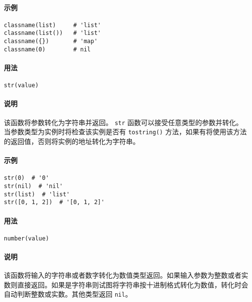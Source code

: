 \paragraph{示例}
\begin{lstlisting}[language=berry, numbers=none]
classname(list)     # 'list'
classname(list())   # 'list'
classname({})       # 'map'
classname(0)        # nil
\end{lstlisting}


\paragraph{用法}
\begin{lstlisting}[language=berry, numbers=none]
str(value)
\end{lstlisting}

\paragraph{说明}
该函数将参数转化为字符串并返回。 \texttt{str} 函数可以接受任意类型的参数并转化。当参数类型为实例时将检查该实例是否有 \texttt{tostring()} 方法，如果有将使用该方法的返回值，否则将实例的地址转化为字符串。

\paragraph{示例}
\begin{lstlisting}[language=berry, numbers=none]
str(0)  # '0'
str(nil)  # 'nil'
str(list)  # 'list'
str([0, 1, 2])  # '[0, 1, 2]'
\end{lstlisting}


\paragraph{用法}
\begin{lstlisting}[language=berry, numbers=none]
number(value)
\end{lstlisting}

\paragraph{说明}
该函数将输入的字符串或者数字转化为数值类型返回。如果输入参数为整数或者实数则直接返回。如果是字符串则试图将字符串按十进制格式转化为数值，转化时会自动判断整数或实数。其他类型返回 \texttt{nil}。

